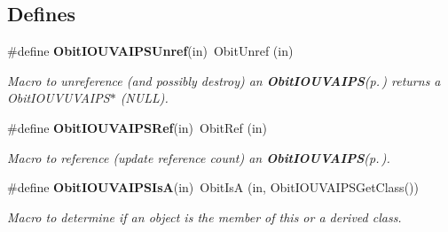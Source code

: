 \subsection*{Defines}
\begin{CompactItemize}
\item 
\#define {\bf Obit\-IOUVAIPSUnref}(in)\ Obit\-Unref (in)
\begin{CompactList}\small\item\em Macro to unreference (and possibly destroy) an {\bf Obit\-IOUVAIPS}{\rm (p.\,\pageref{structObitIOUVAIPS})} returns a Obit\-IOUVUVAIPS$\ast$ (NULL). \item\end{CompactList}\item 
\#define {\bf Obit\-IOUVAIPSRef}(in)\ Obit\-Ref (in)
\begin{CompactList}\small\item\em Macro to reference (update reference count) an {\bf Obit\-IOUVAIPS}{\rm (p.\,\pageref{structObitIOUVAIPS})}. \item\end{CompactList}\item 
\#define {\bf Obit\-IOUVAIPSIs\-A}(in)\ Obit\-Is\-A (in, Obit\-IOUVAIPSGet\-Class())
\begin{CompactList}\small\item\em Macro to determine if an object is the member of this or a derived class. \item\end{CompactList}\end{CompactItemize}
